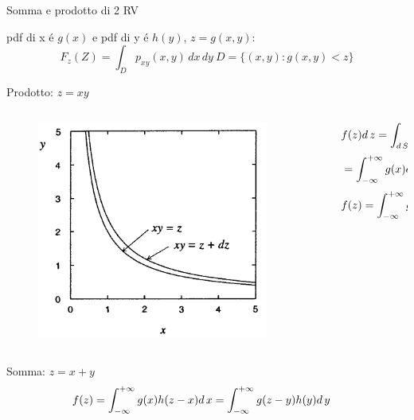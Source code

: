 \documentclass[asd-beamer.tex]{subfiles}%
\begin{document}
\begin{frame}{Somma e prodotto di 2 RV}
\begin{block}{}
pdf di x \'e $g(x)$ e pdf di y \'e $h(y)$, $z=g(x,y)$:
\[F_z(Z)=\int_Dp_{xy}(x,y)\,dx\,dy\ D=\{(x,y):g(x,y)<z\}\]
\end{block}
\begin{block}{Prodotto: $z=xy$}
	\begin{columns}[T]
		\begin{column}{0.3\textwidth}
			\begin{figure}
				\centering
				\includegraphics[keepaspectratio,width=0.9\textwidth]{figures/cowan/probability/RVprod}
				\label{fig:RVprod}
			\end{figure}
		\end{column}
		\begin{column}{0.7\textwidth}
			\begin{align*}
			&f(z)d\,z=\int_{d\,S}g(x)h(y)d\,xd\,y\\
			&=\int_{-\infty}^{+\infty}{}g(x)d\,x\int_{\frac{z}{|x|}}^{\frac{z+d\,z}{|x|}}h(y)d\,y\\
			&f(z)=\int_{-\infty}^{+\infty}{}g(\frac{z}{y})h(y)\frac{d\,y}{|y|}
			\end{align*}
		\end{column}
	\end{columns}
\end{block}
\begin{block}{Somma: $z=x+y$}
	\begin{align*}
	&f(z)=\int_{-\infty}^{+\infty}{}g(x)h(z-x)d\,x=\int_{-\infty}^{+\infty}{}g(z-y)h(y)d\,y
	\end{align*}
\end{block}
\end{frame}
\end{document}
